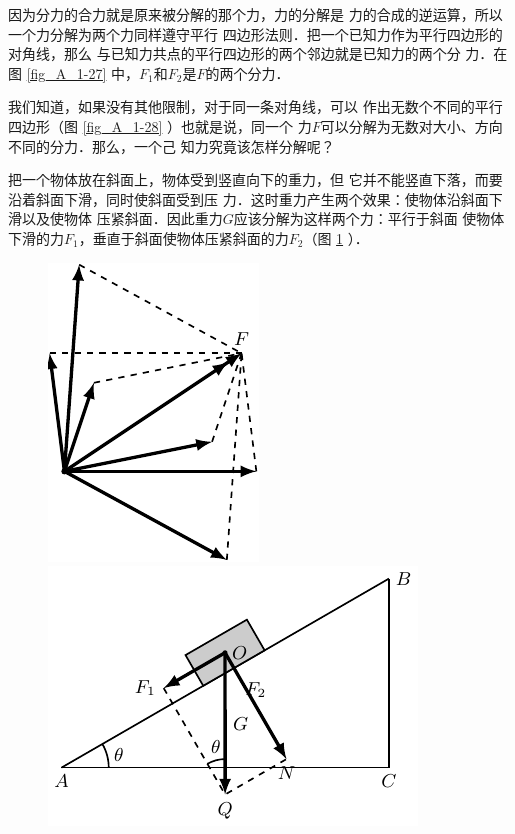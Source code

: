     因为分力的合力就是原来被分解的那个力，力的分解是
力的合成的逆运算，所以一个力分解为两个力同样遵守平行
四边形法则．把一个已知力作为平行四边形的对角线，那么
与已知力共点的平行四边形的两个邻边就是已知力的两个分
力．在图 \ref{fig_A_1-27} 中，$F_1$和$F_2$是$F$的两个分力．


    我们知道，如果没有其他限制，对于同一条对角线，可以
作出无数个不同的平行四边形（图 \ref{fig_A_1-28} ）也就是说，同一个
力$F$可以分解为无数对大小、方向不同的分力．那么，一个己
知力究竟该怎样分解呢？

    把一个物体放在斜面上，物体受到竖直向下的重力，但
它并不能竖直下落，而要沿着斜面下滑，同时使斜面受到压
力．这时重力产生两个效果：使物体沿斜面下滑以及使物体
压紧斜面．因此重力$G$应该分解为这样两个力：平行于斜面
使物体下滑的力$F_1$，垂直于斜面使物体压紧斜面的力$F_2$（图 \ref{fig_A_1-29} ）．


\begin{figure} [htp]
\centering
\begin{minipage} [t]{0.48\textwidth} 
\centering
\includegraphics{fig/A/1-28.pdf} 
\caption{} \label{fig_A_1-28} 
\end{minipage} 
\begin{minipage} [t]{0.48\textwidth} 
\centering
\includegraphics{fig/A/1-29.pdf} 
\caption{} \label{fig_A_1-29} 
\end{minipage} 
\end{figure} 

